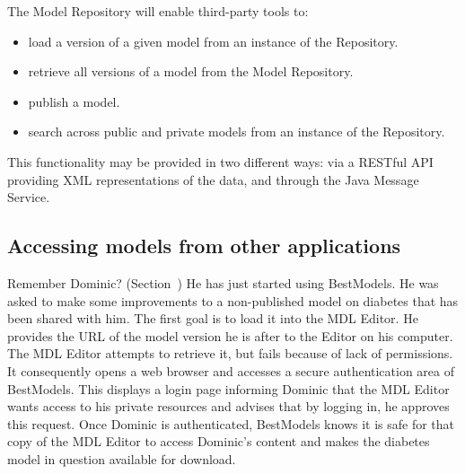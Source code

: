 The \ddmore Model Repository will enable third-party tools to:
\begin{itemize}
\item load a version of a given model from an instance of the Repository.
\item retrieve all versions of a model from the Model Repository.
\item publish a model.
\item search across public and private models from an instance of the Repository.
\end{itemize}

\begin{techNote}
This functionality may be provided in two different ways: via a RESTful API providing XML representations of the data, and through the Java Message Service. 
\end{techNote}


\subsection{Accessing models from other applications}
\label{remoteAuth}
Remember Dominic? (Section~) He has just started using BestModels. He was asked to make some improvements to a non-published model on diabetes that has been shared with him. The first goal is to load it into the MDL Editor. He provides the URL of the model version he is after to the Editor on his computer. The MDL Editor attempts to retrieve it, but fails because of lack of permissions. It consequently opens a web browser and accesses a secure authentication area of BestModels. This displays a login page informing Dominic that the MDL Editor wants access to his private resources and advises that by logging in, he approves this request. Once Dominic is authenticated, BestModels knows it is safe for that copy of the MDL Editor to access Dominic's content and makes the diabetes model in question available for download. 

